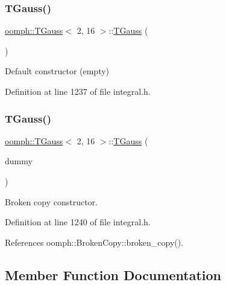 \subsubsection{\texorpdfstring{T\+Gauss()}{TGauss()}\hspace{0.1cm}{\footnotesize\ttfamily [1/2]}}
{\footnotesize\ttfamily \hyperlink{classoomph_1_1TGauss}{oomph\+::\+T\+Gauss}$<$ 2, 16 $>$\+::\hyperlink{classoomph_1_1TGauss}{T\+Gauss} (\begin{DoxyParamCaption}{ }\end{DoxyParamCaption})\hspace{0.3cm}{\ttfamily [inline]}}



Default constructor (empty) 



Definition at line 1237 of file integral.\+h.

\mbox{\label{classoomph_1_1TGauss_3_012_00_0116_01_4_a3b425e4081df0e26aff6e143a11214a0}} 
\subsubsection{\texorpdfstring{T\+Gauss()}{TGauss()}\hspace{0.1cm}{\footnotesize\ttfamily [2/2]}}
{\footnotesize\ttfamily \hyperlink{classoomph_1_1TGauss}{oomph\+::\+T\+Gauss}$<$ 2, 16 $>$\+::\hyperlink{classoomph_1_1TGauss}{T\+Gauss} (\begin{DoxyParamCaption}\item[{const \hyperlink{classoomph_1_1TGauss}{T\+Gauss}$<$ 2, 16 $>$ \&}]{dummy }\end{DoxyParamCaption})\hspace{0.3cm}{\ttfamily [inline]}}



Broken copy constructor. 



Definition at line 1240 of file integral.\+h.



References oomph\+::\+Broken\+Copy\+::broken\+\_\+copy().



\subsection{Member Function Documentation}
\mbox{\label{classoomph_1_1TGauss_3_012_00_0116_01_4_a211df8516816cc9c40e169c2fd73ae77}} 

